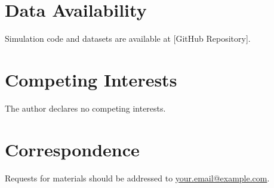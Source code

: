 \documentclass[12pt, a4paper]{article}
\begin{document}
\section*{Data Availability}
Simulation code and datasets are available at [GitHub Repository].

\section*{Competing Interests}
The author declares no competing interests.

\section*{Correspondence}
Requests for materials should be addressed to \url{your.email@example.com}.



\end{document}
